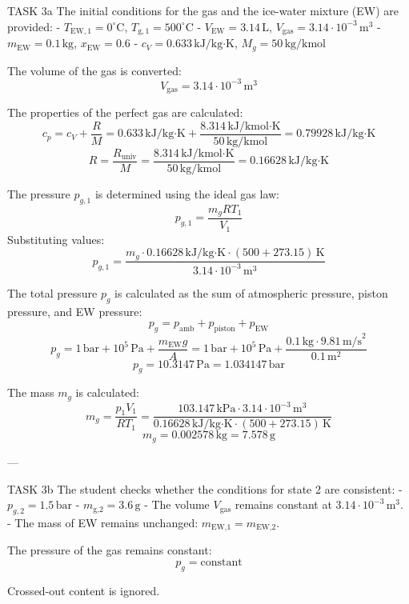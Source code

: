 TASK 3a  
The initial conditions for the gas and the ice-water mixture (EW) are provided:  
- \( T_{\text{EW},1} = 0^\circ\text{C} \), \( T_{\text{g},1} = 500^\circ\text{C} \)  
- \( V_{\text{EW}} = 3.14 \, \text{L} \), \( V_{\text{gas}} = 3.14 \cdot 10^{-3} \, \text{m}^3 \)  
- \( m_{\text{EW}} = 0.1 \, \text{kg} \), \( x_{\text{EW}} = 0.6 \)  
- \( c_V = 0.633 \, \text{kJ/kg·K} \), \( M_g = 50 \, \text{kg/kmol} \)  

The volume of the gas is converted:  
\[
V_{\text{gas}} = 3.14 \cdot 10^{-3} \, \text{m}^3
\]

The properties of the perfect gas are calculated:  
\[
c_p = c_V + \frac{R}{M} = 0.633 \, \text{kJ/kg·K} + \frac{8.314 \, \text{kJ/kmol·K}}{50 \, \text{kg/kmol}} = 0.79928 \, \text{kJ/kg·K}
\]  
\[
R = \frac{R_{\text{univ}}}{M} = \frac{8.314 \, \text{kJ/kmol·K}}{50 \, \text{kg/kmol}} = 0.16628 \, \text{kJ/kg·K}
\]

The pressure \( p_{g,1} \) is determined using the ideal gas law:  
\[
p_{g,1} = \frac{m_g R T_1}{V_1}
\]  
Substituting values:  
\[
p_{g,1} = \frac{m_g \cdot 0.16628 \, \text{kJ/kg·K} \cdot (500 + 273.15) \, \text{K}}{3.14 \cdot 10^{-3} \, \text{m}^3}
\]

The total pressure \( p_g \) is calculated as the sum of atmospheric pressure, piston pressure, and EW pressure:  
\[
p_g = p_{\text{amb}} + p_{\text{piston}} + p_{\text{EW}}
\]  
\[
p_g = 1 \, \text{bar} + 10^5 \, \text{Pa} + \frac{m_{\text{EW}} g}{A} = 1 \, \text{bar} + 10^5 \, \text{Pa} + \frac{0.1 \, \text{kg} \cdot 9.81 \, \text{m/s}^2}{0.1 \, \text{m}^2}
\]  
\[
p_g = 10.3147 \, \text{Pa} = 1.034147 \, \text{bar}
\]

The mass \( m_g \) is calculated:  
\[
m_g = \frac{p_1 V_1}{R T_1} = \frac{103.147 \, \text{kPa} \cdot 3.14 \cdot 10^{-3} \, \text{m}^3}{0.16628 \, \text{kJ/kg·K} \cdot (500 + 273.15) \, \text{K}}
\]  
\[
m_g = 0.002578 \, \text{kg} = 7.578 \, \text{g}
\]

---

TASK 3b  
The student checks whether the conditions for state 2 are consistent:  
- \( p_{g,2} = 1.5 \, \text{bar} \)  
- \( m_{\text{g,2}} = 3.6 \, \text{g} \)  
- The volume \( V_{\text{gas}} \) remains constant at \( 3.14 \cdot 10^{-3} \, \text{m}^3 \).  
- The mass of EW remains unchanged: \( m_{\text{EW,1}} = m_{\text{EW,2}} \).  

The pressure of the gas remains constant:  
\[
p_g = \text{constant}
\]  

Crossed-out content is ignored.